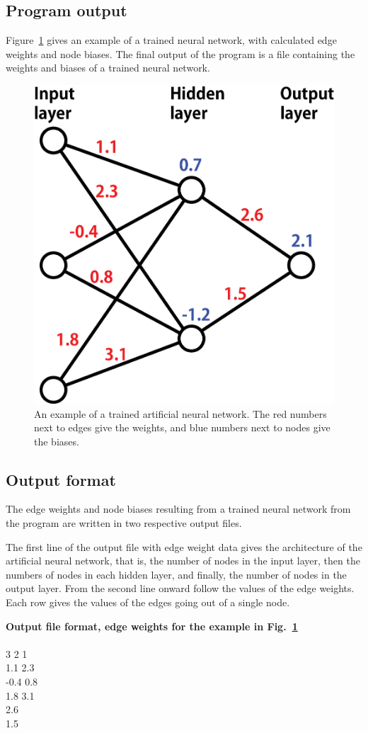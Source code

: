 \documentclass[11pt,titlepage,dvipdfmx,twoside]{article}
\begin{document}
\subsection{Program output}
\label{sec:section3_3}

Figure~\ref{fig:sample} gives an example of a trained neural network, 
with calculated edge weights and node biases.
The final output of the program is a file containing the
weights and biases of a trained neural network.


\begin{figure}[H]
  \centering
  \includegraphics[width = 0.4 \textwidth]{./fig/ANN_sample_en}
  \caption{An example of a trained artificial neural network.
  The red numbers next to edges give the weights, 
  and blue numbers next to nodes give the biases.}
  \label{fig:sample}
\end{figure}


\subsection{Output format}
\label{sec:section3_4}

The edge weights and node biases resulting from a trained neural network from the
program are written in two respective output files.

The first line of the output file with edge weight data
gives the architecture of the artificial neural network,
that is, the number of nodes in the input layer, then the numbers of nodes in each hidden
layer, and finally, the number of nodes in the output layer.
From the second line onward follow the values of the edge weights.
Each row gives the values of the edges going out of a single node.

\bigskip

\begin{oframed}
{\bf Output file format, edge weights for the example in Fig.~\ref{fig:sample}}\\\\
3 2 1\\
1.1 2.3\\
-0.4 0.8\\
1.8 3.1\\
2.6\\
1.5\\
\end{oframed}
\end{document}
